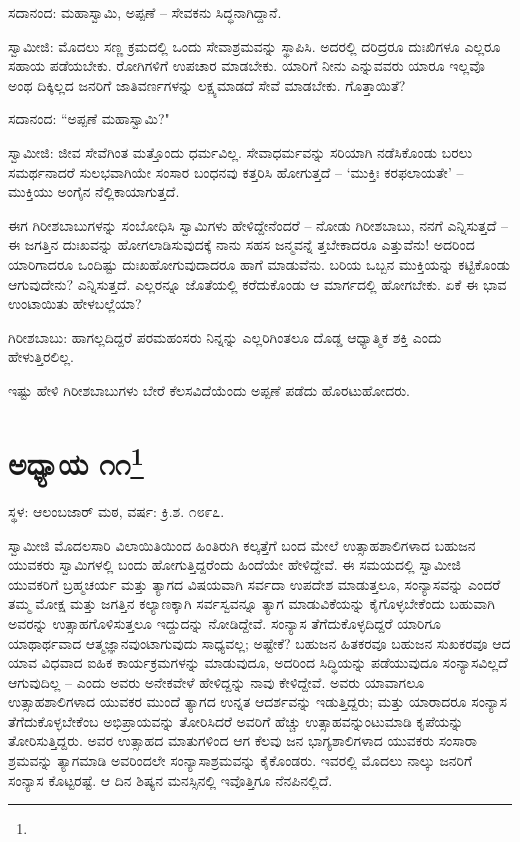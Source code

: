 ಸದಾನಂದ: ಮಹಾಸ್ವಾಮಿ, ಅಪ್ಪಣೆ – ಸೇವಕನು ಸಿದ್ಧನಾಗಿದ್ದಾನೆ.

ಸ್ವಾಮೀಜಿ: ಮೊದಲು ಸಣ್ಣ ಕ್ರಮದಲ್ಲಿ ಒಂದು ಸೇವಾಶ್ರಮವನ್ನು ಸ್ಥಾಪಿಸಿ. ಅದರಲ್ಲಿ ದರಿದ್ರರೂ ದುಃಖಿಗಳೂ ಎಲ್ಲರೂ ಸಹಾಯ ಪಡೆಯಬೇಕು. ರೋಗಿಗಳಿಗೆ ಉಪಚಾರ ಮಾಡಬೇಕು. ಯಾರಿಗೆ ನೀನು ಎನ್ನುವವರು ಯಾರೂ ಇಲ್ಲವೊ ಅಂಥ ದಿಕ್ಕಿಲ್ಲದ ಜನರಿಗೆ ಜಾತಿವರ್ಣಗಳನ್ನು ಲಕ್ಷ್ಯಮಾಡದೆ ಸೇವೆ ಮಾಡಬೇಕು. ಗೊತ್ತಾಯಿತೆ?

ಸದಾನಂದ: “ಅಪ್ಪಣೆ ಮಹಾಸ್ವಾಮಿ?"

ಸ್ವಾಮೀಜಿ: ಜೀವ ಸೇವೆಗಿಂತ ಮತ್ತೊಂದು ಧರ್ಮವಿಲ್ಲ. ಸೇವಾಧರ್ಮವನ್ನು ಸರಿಯಾಗಿ ನಡೆಸಿಕೊಂಡು ಬರಲು ಸಮರ್ಥನಾದರೆ ಸುಲಭವಾಗಿಯೇ ಸಂಸಾರ ಬಂಧನವು ಕತ್ತರಿಸಿ ಹೋಗುತ್ತದೆ – ‘ಮುಕ್ತಿಃ ಕರಫಲಾಯತೇ’ – ಮುಕ್ತಿಯು ಅಂಗೈನ ನೆಲ್ಲಿಕಾಯಾಗುತ್ತದೆ.

ಈಗ ಗಿರೀಶಬಾಬುಗಳನ್ನು ಸಂಬೋಧಿಸಿ ಸ್ವಾಮಿಗಳು ಹೇಳಿದ್ದೇನೆಂದರೆ – ನೋಡು ಗಿರೀಶಬಾಬು, ನನಗೆ ಎನ್ನಿಸುತ್ತದೆ – ಈ ಜಗತ್ತಿನ ದುಃಖವನ್ನು ಹೋಗಲಾಡಿಸುವುದಕ್ಕೆ ನಾನು ಸಹಸ ಜನ್ಮವನ್ನೆ ತ್ತಬೇಕಾದರೂ ಎತ್ತುವೆನು! ಅದರಿಂದ ಯಾರಿಗಾದರೂ ಒಂದಿಷ್ಟು ದುಃಖಹೋಗುವುದಾದರೂ ಹಾಗೆ ಮಾಡುವೆನು. ಬರಿಯ ಒಬ್ಬನ ಮುಕ್ತಿಯನ್ನು ಕಟ್ಟಿಕೊಂಡು ಆಗುವುದೇನು? ಎನ್ನಿಸುತ್ತದೆ. ಎಲ್ಲರನ್ನೂ ಜೊತೆಯಲ್ಲಿ ಕರೆದುಕೊಂಡು ಆ ಮಾರ್ಗದಲ್ಲಿ ಹೋಗಬೇಕು. ಏಕೆ ಈ ಭಾವ ಉಂಟಾಯಿತು ಹೇಳಬಲ್ಲೆಯಾ?

ಗಿರೀಶಬಾಬು: ಹಾಗಲ್ಲದಿದ್ದರೆ ಪರಮಹಂಸರು ನಿನ್ನನ್ನು ಎಲ್ಲರಿಗಿಂತಲೂ ದೊಡ್ಡ ಆಧ್ಯಾತ್ಮಿಕ ಶಕ್ತಿ ಎಂದು ಹೇಳುತ್ತಿರಲಿಲ್ಲ.

ಇಷ್ಟು ಹೇಳಿ ಗಿರೀಶಬಾಬುಗಳು ಬೇರೆ ಕೆಲಸವಿದೆಯೆಂದು ಅಪ್ಪಣೆ ಪಡೆದು ಹೊರಟುಹೋದರು.

\newpage

\chapter[ಅಧ್ಯಾಯ ೧೧]{ಅಧ್ಯಾಯ ೧೧\protect\footnote{}}

\centerline{ಸ್ಥಳ: ಆಲಂಬಜಾರ್ ಮಠ, ವರ್ಷ: ಕ್ರಿ.ಶ. ೧೮೯೭.}

ಸ್ವಾಮೀಜಿ ಮೊದಲಸಾರಿ ವಿಲಾಯಿತಿಯಿಂದ ಹಿಂತಿರುಗಿ ಕಲ್ಕತ್ತೆಗೆ ಬಂದ ಮೇಲೆ ಉತ್ಸಾಹಶಾಲಿಗಳಾದ ಬಹುಜನ ಯುವಕರು ಸ್ವಾಮಿಗಳಲ್ಲಿ ಬಂದು ಹೋಗುತ್ತಿದ್ದರೆಂದು ಹಿಂದೆಯೇ ಹೇಳಿದ್ದೇವೆ. ಈ ಸಮಯದಲ್ಲಿ ಸ್ವಾಮೀಜಿ ಯುವಕರಿಗೆ ಬ್ರಹ್ಮಚರ್ಯ ಮತ್ತು ತ್ಯಾಗದ ವಿಷಯವಾಗಿ ಸರ್ವದಾ ಉಪದೇಶ ಮಾಡುತ್ತಲೂ, ಸಂನ್ಯಾಸವನ್ನು ಎಂದರೆ ತಮ್ಮ ಮೋಕ್ಷ ಮತ್ತು ಜಗತ್ತಿನ ಕಲ್ಯಾಣಕ್ಕಾಗಿ ಸರ್ವಸ್ವವನ್ನೂ ತ್ಯಾಗ ಮಾಡುವಿಕೆಯನ್ನು ಕೈಗೊಳ್ಳಬೇಕೆಂದು ಬಹುವಾಗಿ ಅವರನ್ನು ಉತ್ಸಾಹಗೊಳಿಸುತ್ತಲೂ ಇದ್ದುದನ್ನು ನೋಡಿದ್ದೇವೆ. ಸಂನ್ಯಾಸ ತೆಗೆದುಕೊಳ್ಳದಿದ್ದರೆ ಯಾರಿಗೂ ಯಾಥಾರ್ಥವಾದ ಆತ್ಮಜ್ಞಾನವುಂಟಾಗುವುದು ಸಾಧ್ಯವಲ್ಲ; ಅಷ್ಟೇಕೆ? ಬಹುಜನ ಹಿತಕರವೂ ಬಹುಜನ ಸುಖಕರವೂ ಆದ ಯಾವ ವಿಧವಾದ ಐಹಿಕ ಕಾರ್ಯಕ್ರಮಗಳನ್ನು ಮಾಡುವುದೂ, ಅದರಿಂದ ಸಿದ್ಧಿಯನ್ನು ಪಡೆಯುವುದೂ ಸಂನ್ಯಾಸವಿಲ್ಲದೆ ಆಗುವುದಿಲ್ಲ – ಎಂದು ಅವರು ಅನೇಕವೇಳೆ ಹೇಳಿದ್ದನ್ನು ನಾವು ಕೇಳಿದ್ದೇವೆ. ಅವರು ಯಾವಾಗಲೂ ಉತ್ಸಾಹಶಾಲಿಗಳಾದ ಯುವಕರ ಮುಂದೆ ತ್ಯಾಗದ ಉನ್ನತ ಆದರ್ಶವನ್ನು ಇಡುತ್ತಿದ್ದರು; ಮತ್ತು ಯಾರಾದರೂ ಸಂನ್ಯಾಸ ತೆಗೆದುಕೊಳ್ಳಬೇಕೆಂಬ ಅಭಿಪ್ರಾಯವನ್ನು ತೋರಿಸಿದರೆ ಅವರಿಗೆ ಹೆಚ್ಚು ಉತ್ಸಾಹವನ್ನುಂಟುಮಾಡಿ ಕೃಪೆಯನ್ನು ತೋರಿಸುತ್ತಿದ್ದರು. ಅವರ ಉತ್ಸಾಹದ ಮಾತುಗಳಿಂದ ಆಗ ಕೆಲವು ಜನ ಭಾಗ್ಯಶಾಲಿಗಳಾದ ಯುವಕರು ಸಂಸಾರಾ ಶ್ರಮವನ್ನು ತ್ಯಾಗಮಾಡಿ ಅವರಿಂದಲೇ ಸಂನ್ಯಾಸಾಶ್ರಮವನ್ನು ಕೈಕೊಂಡರು. ಇವರಲ್ಲಿ ಮೊದಲು ನಾಲ್ಕು ಜನರಿಗೆ ಸಂನ್ಯಾಸ ಕೊಟ್ಟರಷ್ಟೆ. ಆ ದಿನ ಶಿಷ್ಯನ ಮನಸ್ಸಿನಲ್ಲಿ ಇವೊತ್ತಿಗೂ ನೆನಪಿನಲ್ಲಿದೆ.

